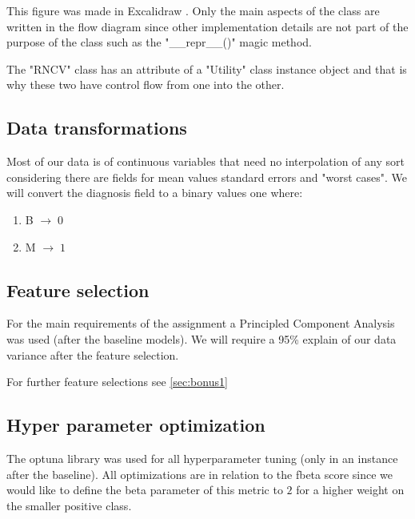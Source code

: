 \documentclass[12pt, a4paper]{article}
\begin{document}
\begin{multicols}{2}

    This figure was made in Excalidraw \cite{}. Only the main aspects of the class are written in the flow diagram since other implementation details are not part of the purpose of the class such as the "\_\_repr\_\_()" magic method.
    \newline

    The "RNCV" class has an attribute of a "Utility" class instance object and that is why these two have control flow from one into the other.
    \newline

    \subsection{Data transformations} \label{subsec:transforms}

    Most of our data is of continuous variables that need no interpolation of any sort considering there are fields for mean values standard errors and "worst cases". We will convert the diagnosis field to a binary values one where:
    \newline

    \begin{enumerate} \label{enm:casting}
        \item B $\rightarrow \; 0$
        \item M $\rightarrow \; 1$
    \end{enumerate}

    \subsection{Feature selection} \label{subsec:fselect}

    For the main requirements of the assignment a Principled Component Analysis was used (after the baseline models). We will require a 95\% explain of our data variance after the feature selection.
    \newline

    For further feature selections see \ref{sec:bonus1}
    \newline

    \subsection{Hyper parameter optimization} \label{subsec:optuna}

    The optuna library \cite{} was used for all hyperparameter tuning (only in an instance after the baseline). All optimizations are in relation to the fbeta score since we would like to define the beta parameter of this metric to $2$ for a higher weight on the smaller positive class.
    \newline


\end{multicols}
\end{document}
